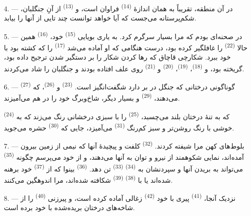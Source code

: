 4. --- در آن منطقه،  تقریباً به همان اندازهٔ
 \textsuperscript{(14)} فراوان است، و 
\textsuperscript{(13)} از آنِ جنگلبان، شکم‌پرستانه می‌جست که آیا
خواهد توانست چند تایی از آنها را بیابد.

\VUsaut{3.0mm}
\VUsaut{3.0mm}

5. --- در  صحنه‌ای بودم که مرا بسیار سرگرم کرد. به یاری
بویایی  \textsuperscript{(15)} خود، 
\textsuperscript{(16)} همین حالا 
\textsuperscript{(22)} را غافلگیر کرده بود، درست هنگامی که او آماده
می‌شد  \textsuperscript{(17)} را که کشته بود با خود ببرد.
شکارچی قاچاق که رها کردن شکار را بر دستگیر شدن ترجیح داده بود، گریخته
بود، و  \textsuperscript{(18)}، 
\textsuperscript{(19)}،  \textsuperscript{(20)} و
 \textsuperscript{(21)} روی علف افتاده بودند و جنگلبان را
شاد می‌کردند.

6. --- گوناگونی درختانی که جنگل در بر دارد شگفت‌انگیز است.
 \textsuperscript{(23)} و 
\textsuperscript{(26)}،  که 
\textsuperscript{(27)} می‌دهند،  \textsuperscript{(29)}
و بسیار دیگر، شاخ‌وبرگ خود را در هم می‌آمیزند.

 \textsuperscript{(24)} که به تنهٔ درختان بلند می‌چسبد،
 \textsuperscript{(25)} را با سبزی درخشانی رنگ می‌زند که
به خوشی با رنگ روشن‌تر و سبز کم‌رنگ  \textsuperscript{(31)}
می‌آمیزد، جایی که  \textsuperscript{(30)} حشره
می‌جوید.

\VUsaut{3.0mm}
\VUsaut{3.0mm}

7. --- بلوط‌های کهن مرا شیفته کردند. 
\textsuperscript{(32)} کلفت و پیچیدهٔ آنها که نیمی از زمین بیرون
آمده‌اند، نمایی شکوهمند از نیرو و توان به آنها می‌دهند، و از خود
می‌پرسم چگونه  \textsuperscript{(35)} می‌تواند به بریدن
آنها و سپردنشان به  \textsuperscript{(34)}
 \textsuperscript{(33)} تن دهد. 
\textsuperscript{(36)} بینوا که از  \textsuperscript{(37)}
خود برهنه شده‌اند یا با  \textsuperscript{(38)}
 \textsuperscript{(39)} شکافته شده‌اند، مرا
اندوهگین می‌کنند.

8. --- نزدیک آنجا،  \textsuperscript{(41)} پیری با
 خود  \textsuperscript{(42)} زغالی آماده
کرده است، و پیرزنی  \textsuperscript{(40)}  را از شاخه‌های درختان بریده‌شده با خود برده است.

